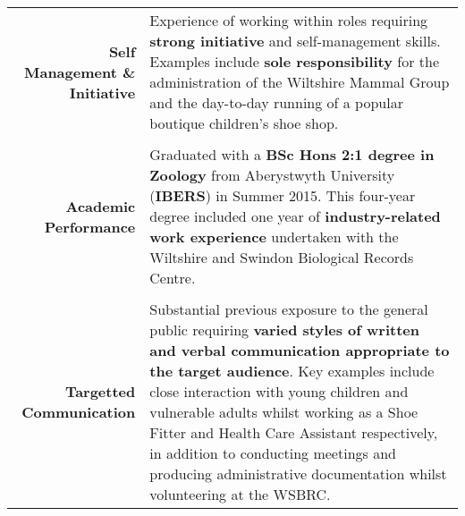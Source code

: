 \documentclass[a4paper, 10pt]{extarticle} %
\begin{document}
\begin{small}
\begin{tabular}{r | p{12cm}}

		\begin{minipage}[t]{2.5cm}
		\begin{flushright}
			\textbf{Self Management \& Initiative}
		\end{flushright}
		\end{minipage} 
		
		& 
		
		  Experience of working within roles requiring \textbf{strong initiative} and self-management skills. Examples include \textbf{sole responsibility} for the administration of the Wiltshire Mammal Group and the day-to-day running of a popular boutique children's shoe shop. \\

	\multicolumn{2}{c}{} \\
	
		\begin{minipage}[t]{2.5cm}
		\begin{flushright}
			\textbf{Academic Performance}
		\end{flushright}
		\end{minipage} 
		
		& 
	 
		 Graduated with a \textbf{BSc Hons 2:1 degree in Zoology} from Aberystwyth University (\textbf{IBERS}) in Summer 2015. This four-year degree included one year of \textbf{industry-related work experience} undertaken with the Wiltshire and Swindon Biological Records Centre. \\
		
		\multicolumn{2}{c}{} \\
	

	\begin{minipage}[t]{2.5cm}
		\begin{flushright}
			\textbf{Targetted Communication}
		\end{flushright}
	\end{minipage} 
		
		& 
		
		Substantial previous exposure to the general public requiring \textbf{varied styles of written and verbal communication appropriate to the target audience}. Key examples include close interaction with young children and vulnerable adults whilst working as a Shoe Fitter and Health Care Assistant respectively, in addition to conducting meetings and producing administrative documentation whilst volunteering at the WSBRC. \\
		

\end{tabular}
\end{small}
\end{document}
